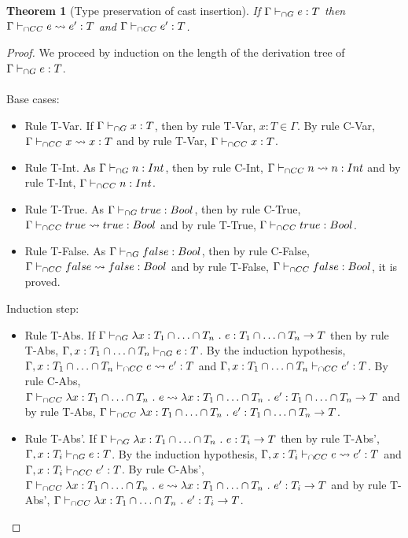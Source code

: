 \documentclass[a4paper]{article}
\newtheorem{theorem}{Theorem}
\begin{document}
\begin{theorem}[Type preservation of cast insertion]
\label{type_preservation_cast_insertion}
If $\Gamma \vdash_{\cap G} e : T$ then $\Gamma \vdash_{\cap CC} e \leadsto e' : T$ and $\Gamma \vdash_{\cap CC} e' : T$.
\end{theorem}
\begin{proof}
We proceed by induction on the length of the derivation tree of $\Gamma \vdash_{\cap G} e : T$.\\\\
Base cases:
\begin{itemize}
    \item Rule T-Var.
    If $\Gamma \vdash_{\cap G} x : T$, then by rule T-Var, $x : T \in \Gamma$.
    By rule C-Var, $\Gamma \vdash_{\cap CC} x \leadsto x : T$ and by rule T-Var, $\Gamma \vdash_{\cap CC} x : T$.
    \item Rule T-Int.
    As $\Gamma \vdash_{\cap G} n : {Int}$, then by rule C-Int, $\Gamma \vdash_{\cap CC} n \leadsto n : {Int}$ and by rule T-Int, $\Gamma \vdash_{\cap CC} n : {Int}$.
    \item Rule T-True.
    As $\Gamma \vdash_{\cap G} true : Bool$, then by rule C-True, $\Gamma \vdash_{\cap CC} true \leadsto true : Bool$ and by rule T-True, $\Gamma \vdash_{\cap CC} true : Bool$.
    \item Rule T-False.
    As $\Gamma \vdash_{\cap G} false : Bool$, then by rule C-False, $\Gamma \vdash_{\cap CC} false \leadsto false : Bool$ and by rule T-False, $\Gamma \vdash_{\cap CC} false : Bool$, it is proved.
\end{itemize}
Induction step:
\begin{itemize}
    \item Rule T-Abs.
    If $\Gamma \vdash_{\cap G} \lambda x : T_1 \cap \ldots \cap T_n\ .\ e : T_1 \cap \ldots \cap T_n \rightarrow T$ then by rule T-Abs, $\Gamma, x : T_1 \cap \ldots \cap T_n \vdash_{\cap G} e : T$.
    By the induction hypothesis, $\Gamma, x : T_1 \cap \ldots \cap T_n \vdash_{\cap CC} e \leadsto e' : T$ and $\Gamma, x : T_1 \cap \ldots \cap T_n \vdash_{\cap CC} e' : T$.
    By rule C-Abs, $\Gamma \iccts \lambda x : T_1 \cap \ldots \cap T_n\ .\ e \leadsto \lambda x : T_1 \cap \ldots \cap T_n\ .\ e' : T_1 \cap \ldots \cap T_n \rightarrow T$ and by rule T-Abs, $\Gamma \iccts \lambda x : T_1 \cap \ldots \cap T_n\ .\ e' : T_1 \cap \ldots \cap T_n \rightarrow T$.
    \item Rule T-Abs'.
    If $\Gamma \vdash_{\cap G} \lambda x : T_1 \cap \ldots \cap T_n\ .\ e : T_i \rightarrow T$ then by rule T-Abs', $\Gamma, x : T_i \vdash_{\cap G} e : T$.
    By the induction hypothesis, $\Gamma, x : T_i \vdash_{\cap CC} e \leadsto e' : T$ and $\Gamma, x : T_i \vdash_{\cap CC} e' : T$.
    By rule C-Abs', $\Gamma \vdash_{\cap CC} \lambda x : T_1 \cap \ldots \cap T_n\ .\ e \leadsto \lambda x : T_1 \cap \ldots \cap T_n\ .\ e' : T_i \rightarrow T$ and by rule T-Abs', $\Gamma \iccts \lambda x : T_1 \cap \ldots \cap T_n\ .\ e' : T_i \rightarrow T$.

\end{itemize}
\end{proof}
\end{document}
